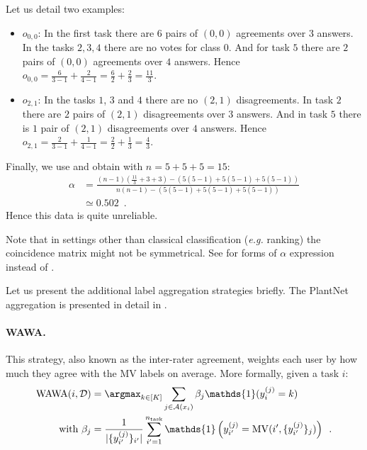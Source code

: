 \begin{constructionbox}
Let us detail two examples:
\begin{itemize}
    \item $o_{0,0}$: In the first task there are $6$ pairs of $(0,0)$ agreements over $3$ answers. In the tasks $2,3,4$ there are no votes for class $0$. And for task $5$ there are $2$ pairs of $(0,0)$ agreements over $4$ answers. Hence $o_{0,0}=\frac{6}{3-1} + \frac{2}{4-1}=\frac{6}{2} + \frac{2}{3}=\frac{11}{3}$.
    \item $o_{2,1}$: In the tasks $1$, $3$ and $4$ there are no $(2,1)$ disagreements. In task $2$ there are $2$ pairs of $(2,1)$ disagreements over $3$ answers. And in task $5$ there is $1$ pair of $(2,1)$ disagreements over $4$ answers. Hence $o_{2,1}=\frac{2}{3-1} + \frac{1}{4-1}=\frac{2}{2} + \frac{1}{3}=\frac{4}{3}$.
\end{itemize}
Finally, we use  and obtain with $n=5+5+5=15$:
\begin{align*}
\alpha  &= \frac{(n-1)\left(\frac{11}{3} + 3 + 3\right) - \left(5(5-1)  + 5(5-1) + 5(5-1)\right)}{n(n-1) - \left(5(5-1)  + 5(5-1) + 5(5-1)\right)} \\
        &\simeq 0.502 \enspace.
\end{align*}
Hence this data is quite unreliable.

Note that in settings other than classical classification (\emph{e.g.} ranking) the coincidence matrix might not be symmetrical.
See \citet{krippendorff1980validity} for forms of $\alpha$ expression instead of .
\end{constructionbox}

Let us present the additional label aggregation strategies briefly. The PlantNet aggregation is presented in detail in .
\paragraph{WAWA.}
This strategy, also known as the inter-rater agreement, weights each user by how much they agree with the MV labels on average. More formally, given a task $i$:
\begin{align*}
    \mathrm{WAWA}(i, \mathcal{D}) &= \argmax_{k\in [K]} \sum_{j\in \mathcal{A}(x_i)} \beta_j\mathds{1}(y_i^{(j)} = k) \\
    \text{with } \beta_j &= \frac{1}{|\{y_{i'}^{(j)}\}_{i'}|} \sum_{i'=1}^{n_{\mathrm{task}}} \mathds{1}\left(y_{i'}^{(j)} = \mathrm{MV}(i', \{y_{i'}^{(j)}\}_j)\right)\enspace.
    \end{align*}

